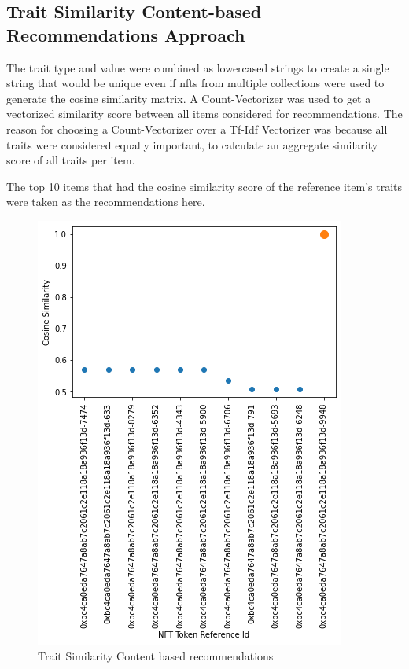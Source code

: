 \documentclass[conference]{IEEEtran}
\begin{document}
\subsection{Trait Similarity Content-based Recommendations Approach}

The trait type and value were combined as lowercased strings to create a single string that would be unique even if \gls{nft}s from multiple collections were used to generate the cosine similarity matrix. A Count-Vectorizer was used to get a vectorized similarity score between all items considered for recommendations. The reason for choosing a Count-Vectorizer over a Tf-Idf Vectorizer was because all traits were considered equally important, to calculate an aggregate similarity score of all traits per item.

The top 10 items that had the cosine similarity score of the reference item's traits were taken as the recommendations here.

\begin{figure}[htbp]
\centerline{\includegraphics[width=\linewidth]{images/Cosine Similarities of Recommended NFTs - Trait Content Based Recomendations Model.png}}
\caption{Trait Similarity Content based recommendations}
\label{fig:trait-content-output}
\end{figure}
\end{document}
